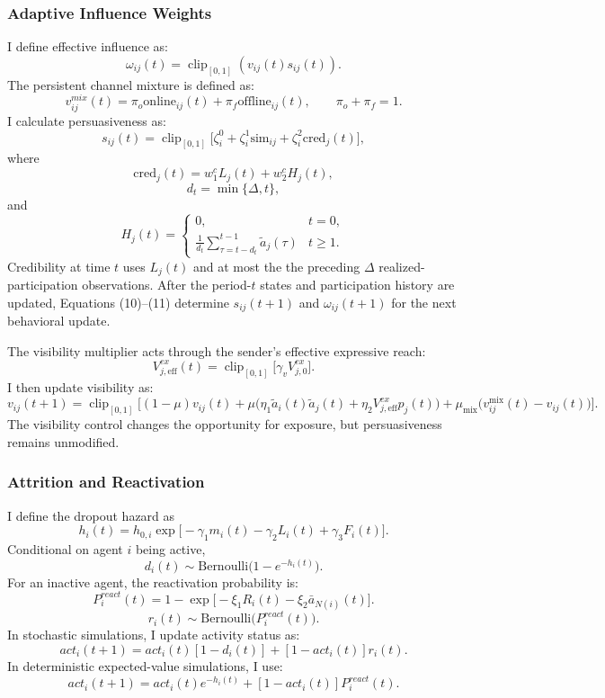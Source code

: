 \documentclass[11pt]{article}
\newcommand{\clip}{\operatorname{clip}_{[0,1]}}
\begin{document}
\subsubsection{Adaptive Influence Weights}
I define effective influence as:
\[
\omega_{ij}(t)=\clip(v_{ij}(t)s_{ij}(t)).
\tag{9}
\]
The persistent channel mixture is defined as:
\[
v_{ij}^{mix}(t)=\pi_o\text{online}_{ij}(t)+\pi_f\text{offline}_{ij}(t), \qquad \pi_o+\pi_f=1.
\tag{12}
\]
I calculate persuasiveness as:
\[
s_{ij}(t)= \clip\big[\zeta_i^0+\zeta_i^1\mathrm{sim}_{ij}+\zeta_i^2\mathrm{cred}_j(t)\big],\tag{10}\label{eq:persuade}
\]
where
\[
\mathrm{cred}_j(t)=w_1^cL_j(t)+w_2^cH_j(t),\tag{11}\label{eq:cred}
\]
\[
d_t=\min\{\Delta,t\},
\]
and
\[
H_j(t)=
\begin{cases}
0, & t=0, \\
\frac{1}{d_t}\sum_{\tau=t-d_t}^{t-1}\tilde a_j(\tau) & t\ge1.
\end{cases}
\]
Credibility at time $t$ uses $L_j(t)$ and at most the the preceding $\Delta$ realized-participation observations. After the period-$t$ states and participation history are updated, Equations (10)--(11) determine $s_{ij}(t+1)$ and $\omega_{ij}(t+1)$ for the next behavioral update.

The visibility multiplier acts through the sender’s effective expressive reach:
\[
V_{j,\text{eff}}^{ex}(t)=\clip\big[\gamma_vV_{j,0}^{ex}\big].
\]
I then update visibility as:
\begin{equation}\tag{13}\label{eq:vupdate}
v_{ij}(t{+}1)=\clip\!\Big[(1-\mu)v_{ij}(t)+\mu\big(\eta_1\tilde a_i(t)\tilde a_j(t)+\eta_2V^{ex}_{j,\text{eff}}p_j(t)\big)+\mu_{\mathrm{mix}}\big(v_{ij}^{\mathrm{mix}}(t)-v_{ij}(t)\big)\Big].
\end{equation}
The visibility control changes the opportunity for exposure, but persuasiveness remains unmodified.

\subsubsection{Attrition and Reactivation}
I define the dropout hazard as
\[
h_i(t)=h_{0,i}\exp\big[-\gamma_1m_i(t)-\gamma_2L_i(t)+\gamma_3F_i(t)\big].
\tag{15}
\]
Conditional on agent $i$ being active,
\[
d_i(t)\sim \text{Bernoulli}\big(1-e^{-h_i(t)}\big).
\]
For an inactive agent, the reactivation probability is:
\[
P_i^{react}(t)=1-\exp\big[-\xi_1R_i(t)-\xi_2\bar{a}_{N(i)}(t)\big].
\]
\[
r_i(t)\sim \text{Bernoulli}\big(P_i^{react}(t)\big).
\tag{16}
\]
In stochastic simulations, I update activity status as:
\[
act_i(t+1)=act_i(t)[1-d_i(t)]+[1-act_i(t)]r_i(t).
\]
In deterministic expected-value simulations, I use:
\[
act_i(t+1)=act_i(t)e^{-h_i(t)}+[1-act_i(t)]P_i^{react}(t).
\]
\end{document}
